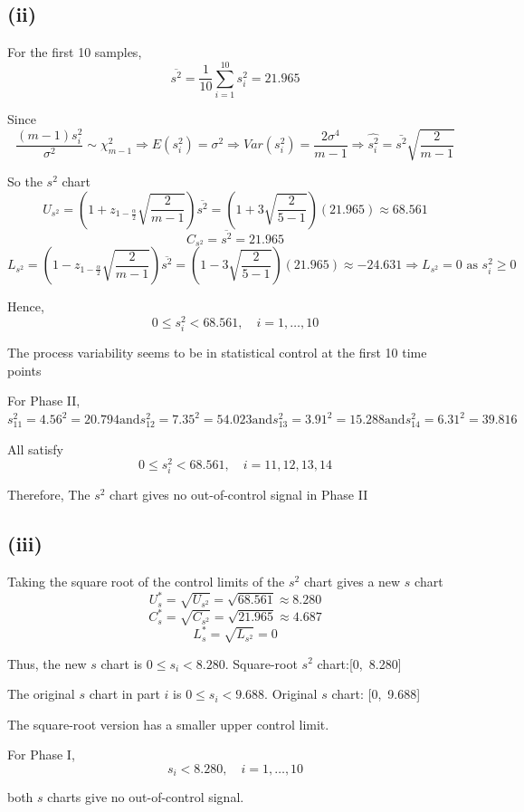 \documentclass[a4paper, 12pt]{article}  %
\begin{document}
\subsection*{(ii)}

For the first 10 samples,
$$
\overline{s^2}=\frac{1}{10}\sum_{i=1}^{10}s_i^2=21.965
$$

Since
$$
\frac{(m-1)s_i^2}{\sigma^2}\sim \chi^2_{m-1}\Rightarrow E(s_i^2)=\sigma^2\Rightarrow Var(s_i^2)=\frac{2\sigma^4}{m-1}\Rightarrow \hat{s_i^2}=\bar {s^2}\sqrt{\frac{2}{m-1}}
$$

So the \(s^2\) chart
$$
U_{s^2}
=\left(1+z_{1-\frac{\alpha}{2}}\sqrt{\frac{2}{m-1}}\right)\overline{s^2}
=\left(1+3\sqrt{\frac{2}{5-1}}\right)(21.965)\approx 68.561
$$
$$
C_{s^2}=\overline{s^2}=21.965
$$
$$
L_{s^2}
=\left(1-z_{1-\frac{\alpha}{2}}\sqrt{\frac{2}{m-1}}\right)\overline{s^2}
=\left(1-3\sqrt{\frac{2}{5-1}}\right)(21.965)\approx -24.631\Rightarrow L_{s^2}=0 \text{ as } s_i^2\ge0
$$

Hence,
$$
0\le s_i^2<68.561,\quad i=1,\ldots,10
$$

The process variability seems to be in statistical control at the first 10 time points

For Phase II,
$
s_{11}^2=4.56^2=20.794
　　\text{and}　　
s_{12}^2=7.35^2=54.023
　　\text{and}　　
s_{13}^2=3.91^2=15.288
　　\text{and}　　
s_{14}^2=6.31^2=39.816
$

All satisfy
$$
0\le s_i^2<68.561,\quad i=11,12,13,14
$$

Therefore,
The $s^2$ chart gives no out-of-control signal in Phase II

\subsection*{(iii)}

Taking the square root of the control limits of the \(s^2\) chart gives a new \(s\) chart
$$
U_s^*
=
\sqrt{U_{s^2}}
=
\sqrt{68.561}
\approx 8.280
$$
$$
C_s^*
=
\sqrt{C_{s^2}}
=
\sqrt{21.965}
\approx 4.687
$$
$$
L_s^*
=
\sqrt{L_{s^2}}
=
0
$$

Thus, the new \(s\) chart is $0\le s_i<8.280$. Square-root $s^2$ chart:[0,\ 8.280]

The original \(s\) chart in part \(i\) is $0\le s_i<9.688$. Original $s$ chart: [0,\ 9.688]

The square-root version has a smaller upper control limit.

For Phase I,
$$
s_i<8.280,\quad i=1,\ldots,10
$$

both \(s\) charts give no out-of-control signal.
\end{document}
